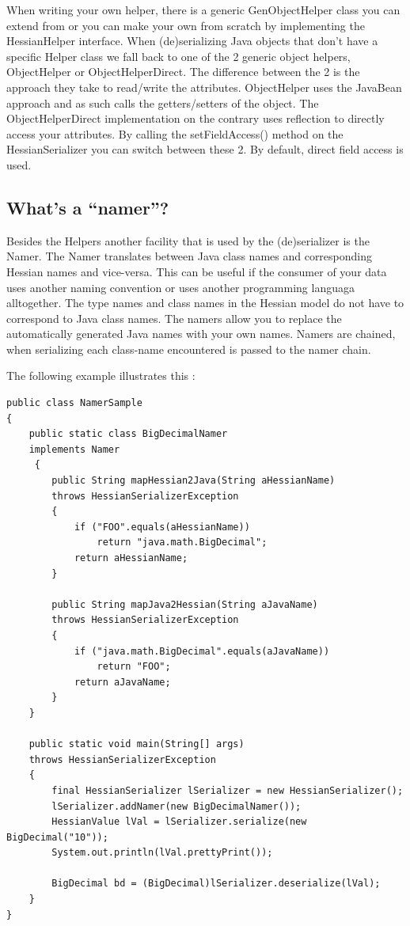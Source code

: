 \documentclass[a4paper]{article}
\begin{document}
When writing your own helper, there is a generic GenObjectHelper class you can extend from or you can make your own from scratch by implementing the HessianHelper interface.  When (de)serializing Java objects that don't have a specific Helper class we fall back to one of the 2 generic object helpers, ObjectHelper or ObjectHelperDirect. The difference between the 2 is the approach they take to read/write the attributes. ObjectHelper uses the JavaBean approach and as such calls the getters/setters of the object.  The ObjectHelperDirect implementation on the contrary uses reflection to directly access your attributes. By calling the setFieldAccess() method on the HessianSerializer you can switch between these 2. 
By default, direct field access is used.

\subsection{What's a ``namer''?}

Besides the Helpers another facility that is used by the (de)serializer is the Namer. The Namer translates between Java class names and corresponding Hessian names and vice-versa. This can be useful if the consumer of your data uses another naming convention or uses another programming languaga alltogether. The type names and class names in the Hessian model do not have to correspond to Java class names. The namers allow you to replace the automatically generated Java names with your own names. Namers are chained, when serializing each class-name encountered is passed to the namer chain.

The following example illustrates this :

\medskip
\begin{lstlisting}
public class NamerSample
{
    public static class BigDecimalNamer 
    implements Namer
     {
        public String mapHessian2Java(String aHessianName) 
        throws HessianSerializerException
        {
            if ("FOO".equals(aHessianName))
                return "java.math.BigDecimal";
            return aHessianName;
        }

        public String mapJava2Hessian(String aJavaName) 
        throws HessianSerializerException
        {
            if ("java.math.BigDecimal".equals(aJavaName))
                return "FOO";
            return aJavaName;
        }
    }

    public static void main(String[] args) 
    throws HessianSerializerException
    {
        final HessianSerializer lSerializer = new HessianSerializer();
        lSerializer.addNamer(new BigDecimalNamer());
        HessianValue lVal = lSerializer.serialize(new BigDecimal("10"));
        System.out.println(lVal.prettyPrint());

        BigDecimal bd = (BigDecimal)lSerializer.deserialize(lVal);
    }
}
\end{lstlisting}
\medskip
\end{document}
